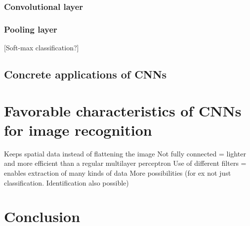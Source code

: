 \documentclass[12pt,a4paper,notitlepage]{article}
\begin{document}
\subsubsection{Convolutional layer}


\subsubsection{Pooling layer}

[Soft-max classification?]

\subsection{Concrete applications of CNNs}

\section{Favorable characteristics of CNNs for image recognition}

Keeps spatial data instead of flattening the image \cite{saha_comprehensive_2018}
Not fully connected = lighter and more efficient than a regular multilayer perceptron
Use of different filters = enables extraction of many kinds of data
More possibilities (for ex not just classification. Identification also possible)

\section{Conclusion}

\clearpage
\begin{flushleft}


\end{flushleft}
\end{document}

